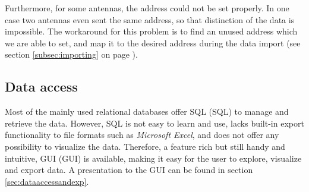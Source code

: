 Furthermore, for some antennas, the address could not be set properly. In one case two antennas even sent the same address, so that distinction of the data is impossible. The workaround for this problem is to find an unused address which we are able to set, and map it to the desired address during the data import (see section \ref{subsec:importing} on page \pageref{subsec:importing}).   

\subsection{Data access}
\label{subsec:dataccess}

Most of the mainly used relational databases offer \ac{SQL} (SQL) to manage and retrieve the data. However, SQL is not easy to learn and use, lacks built-in export functionality to file formats such as \textit{Microsoft Excel}, and does not offer any possibility to visualize the data. Therefore, a feature rich but still handy and intuitive, \ac{GUI} (GUI) is available, making it easy for the user to explore, visualize and export data. A presentation to the GUI can be found in section \ref{sec:dataaccessandexp}.